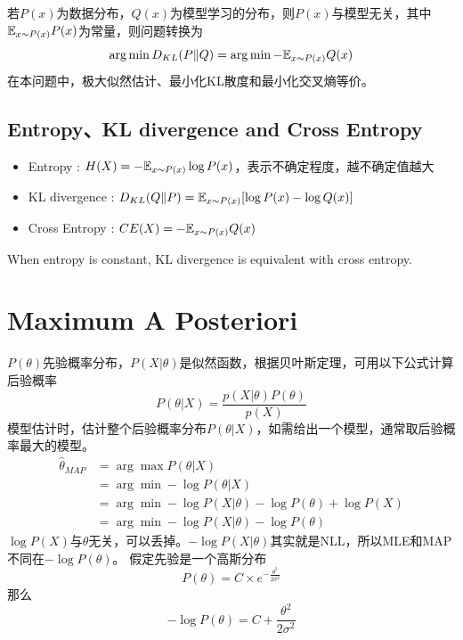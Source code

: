 若$P(x)$为数据分布，$Q(x)$为模型学习的分布，则$P(x)$与模型无关，其中$\mathbb{E}_{x \sim P(x)} P(x)$为常量，则问题转换为
\begin{equation}
    \arg \min D_{KL}(P\|Q) = \arg \min - \mathbb{E}_{x \sim P(x)} Q(x)
\end{equation}
在本问题中，极大似然估计、最小化KL散度和最小化交叉熵等价。

\subsection{Entropy、KL divergence and Cross Entropy}
\begin{itemize}
    \item Entropy : $H(X) = -\mathbb{E}_{x \sim P(x)}\log P(x)$，表示不确定程度，越不确定值越大
    \item KL divergence : $D_{KL}(Q\|P) = \mathbb{E}_{x \sim P(x)}[\log P(x) - \log Q(x)]$
    \item Cross Entropy : $CE(X) = - \mathbb{E}_{x \sim P(x)} Q(x)$
\end{itemize}
When entropy is constant, KL divergence is equivalent with cross entropy.

\section{Maximum A Posteriori}
$P(\theta)$先验概率分布，$P(X|\theta)$是似然函数，根据贝叶斯定理，可用以下公式计算后验概率
\begin{equation}
    P(\theta|X) = \frac{p(X|\theta)P(\theta)}{p(X)}
\end{equation}
模型估计时，估计整个后验概率分布$P(\theta|X)$，如需给出一个模型，通常取后验概率最大的模型。
\begin{equation}
    \begin{split}
        \hat{\theta}_{MAP} &= \arg \max P(\theta | X) \\
        &= \arg \min -\log P(\theta | X) \\
        &= \arg \min -\log P(X|\theta) - \log P(\theta) + \log P(X) \\
        &= \arg \min -\log P(X|\theta) - \log P(\theta)
    \end{split}
\end{equation}
$\log P(X)$与$\theta$无关，可以丢掉。$-\log P(X|\theta)$其实就是NLL，所以MLE和MAP不同在$- \log P(\theta)$。
假定先验是一个高斯分布
\begin{equation}
    P(\theta) = C \times e^{-\frac{\theta^2}{2\sigma^2}}
\end{equation}
那么
\begin{equation}
    -\log P(\theta) = C + \frac{\theta^2}{2\sigma^2}
\end{equation}

